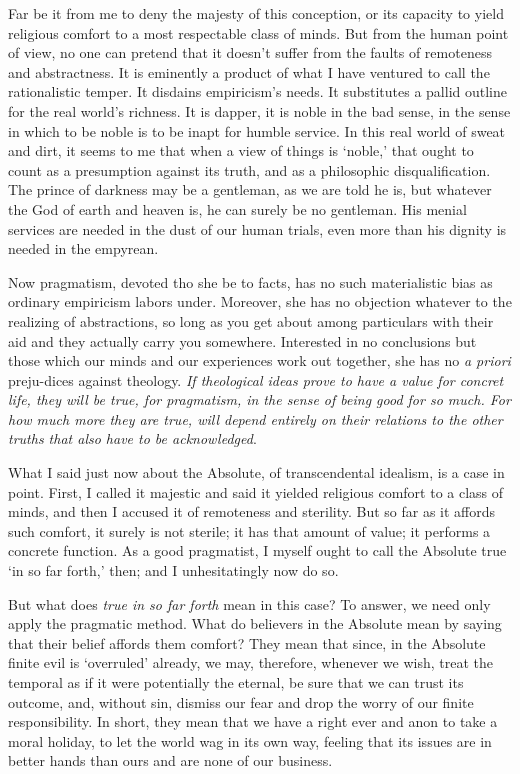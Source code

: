 Far be it from me to deny the majesty of this conception, or its
capacity to yield religious comfort to a most respectable class of
minds. But from the human point of view, no one can pretend that it
doesn't suffer from the faults of remoteness and abstractness. It is
eminently a product of what I have ventured to call the 
rationalistic temper. It disdains empiricism's needs. It substitutes a
pallid outline for the real world's richness. It is dapper, it is
noble in the bad sense, in the sense in which to be noble is to be
inapt for humble service. In this real world of sweat and dirt, it
seems to me that when a view of things is `noble,' that ought to count
as a presumption against its truth, and as a philosophic
disqualification. The prince of darkness may be a gentleman, as we are
told he is, but whatever the God of earth and heaven is, he can surely
be no gentleman. His menial services are needed in the dust of our
human trials, even more than his dignity is needed in the empyrean.

Now pragmatism, devoted tho she be to facts, has no such materialistic
bias as ordinary empiricism labors under. Moreover, she has no
objection whatever to the realizing of abstractions, so long as you
get about among particulars with their aid and they actually carry you
somewhere. Interested in no conclusions but those which our minds and
our experiences work out together, she has no \textit{a priori}
preju-dices against theology. \textit{If theological ideas
prove to have a value for concret life, they will be true, for
pragmatism, in the sense of being good for so much. For how much more
they are true, will depend entirely on their relations to the other
truths that also have to be acknowledged}.

What I said just now about the Absolute, of transcendental idealism,
is a case in point. First, I called it majestic and said it yielded
religious comfort to a class of minds, and then I accused it of
remoteness and sterility. But so far as it affords such comfort, it
surely is not sterile; it has that amount of value; it performs a
concrete function. As a good pragmatist, I myself ought to call the
Absolute true `in so far forth,' then; and I unhesitatingly now do
so.

But what does \textit{true in so far forth} mean in this case? To
answer, we need only apply the pragmatic method. What do believers in
the Absolute mean by saying that their belief affords them comfort?
They mean that since, in the Absolute finite evil is `overruled'
already, we may, therefore, whenever we wish, treat the 
temporal as if it were potentially the eternal, be sure that we can
trust its outcome, and, without sin, dismiss our fear and drop the
worry of our finite responsibility. In short, they mean that we have a
right ever and anon to take a moral holiday, to let the world wag in
its own way, feeling that its issues are in better hands than ours and
are none of our business.

